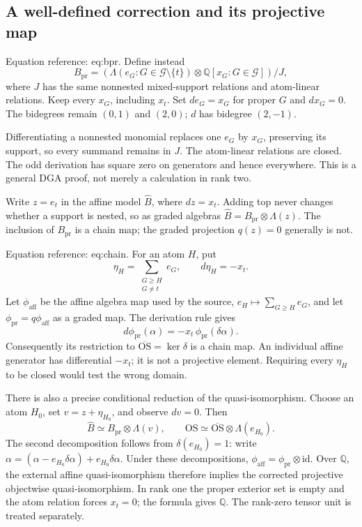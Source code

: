 \documentclass[10pt]{article}
\begin{document}
\subsection*{A well-defined correction and its projective map}
Equation reference: eq:bpr. Define instead \[
 B_{\mathrm{pr}}
 =\left(\Lambda(e_G:G\in\mathcal G\setminus\{t\})
          \otimes\mathbb Q[x_G:G\in\mathcal G]\right)/J,\] where \(J\) has the same nonnested mixed-support relations and atom-linear relations. Keep every \(x_G\), including \(x_t\). Set \(de_G=x_G\) for proper \(G\) and \(dx_G=0\). The bidegrees remain \((0,1)\) and \((2,0)\); \(d\) has bidegree \((2,-1)\).\par
Differentiating a nonnested monomial replaces one \(e_G\) by \(x_G\), preserving its support, so every summand remains in \(J\). The atom-linear relations are closed. The odd derivation has square zero on generators and hence everywhere. This is a general DGA proof, not merely a calculation in rank two.\par
Write \(z=e_t\) in the affine model \(\widehat B\), where \(dz=x_t\). Adding top never changes whether a support is nested, so as graded algebras \(\widehat B=B_{\mathrm{pr}}\otimes\Lambda(z)\). The inclusion of \(B_{\mathrm{pr}}\) is a chain map; the graded projection \(q(z)=0\) generally is not.\par
Equation reference: eq:chain. For an atom \(H\), put \[\eta_H=\sum_{\substack{G\geq H\\G\ne t}}e_G,\qquad
 d\eta_H=-x_t.\] Let \(\phi_{\mathrm{aff}}\) be the affine algebra map used by the source, \(e_H\mapsto\sum_{G\geq H}e_G\), and let \(\phi_{\mathrm{pr}}=q\phi_{\mathrm{aff}}\) as a graded map. The derivation rule gives \[
 d\phi_{\mathrm{pr}}(\alpha)
   =-x_t\,\phi_{\mathrm{pr}}(\delta\alpha).\] Consequently its restriction to \(\overline{\mathrm{OS}}=\ker\delta\) is a chain map. An individual affine generator has differential \(-x_t\); it is not a projective element. Requiring every \(\eta_H\) to be closed would test the wrong domain.\par
There is also a precise conditional reduction of the quasi-isomorphism. Choose an atom \(H_0\), set \(v=z+\eta_{H_0}\), and observe \(dv=0\). Then \[\widehat B\simeq B_{\mathrm{pr}}\otimes\Lambda(v),\qquad
 \mathrm{OS}\simeq\overline{\mathrm{OS}}\otimes\Lambda(e_{H_0}).\] The second decomposition follows from \(\delta(e_{H_0})=1\): write \(\alpha=(\alpha-e_{H_0}\delta\alpha)+e_{H_0}\delta\alpha\). Under these decompositions, \(\phi_{\mathrm{aff}}=\phi_{\mathrm{pr}}\otimes\mathrm{id}\). Over \(\mathbb Q\), the external affine quasi-isomorphism therefore implies the corrected projective objectwise quasi-isomorphism. In rank one the proper exterior set is empty and the atom relation forces \(x_t=0\); the formula gives \(\mathbb Q\). The rank-zero tensor unit is treated separately.\par
\end{document}
